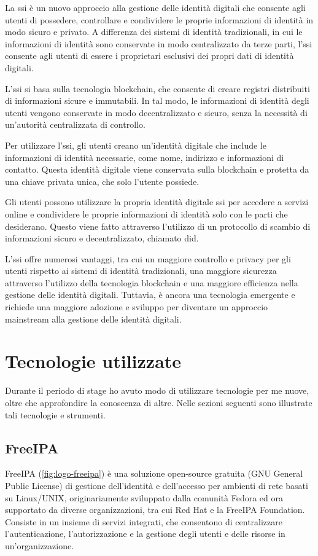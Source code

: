 La \acrfull{ssi}\cite{site:ssi} è un nuovo approccio alla gestione delle identità digitali che consente agli utenti di possedere, controllare e condividere le proprie informazioni di identità in modo sicuro e privato. A differenza dei sistemi di identità tradizionali, in cui le informazioni di identità sono conservate in modo centralizzato da terze parti, l'\acrshort{ssi} consente agli utenti di essere i proprietari esclusivi dei propri dati di identità digitali.

L'\acrshort{ssi} si basa sulla tecnologia blockchain, che consente di creare registri distribuiti di informazioni sicure e immutabili. In tal modo, le informazioni di identità degli utenti vengono conservate in modo decentralizzato e sicuro, senza la necessità di un'autorità centralizzata di controllo.

Per utilizzare l'\acrshort{ssi}, gli utenti creano un'identità digitale che include le informazioni di identità necessarie, come nome, indirizzo e informazioni di contatto. Questa identità digitale viene conservata sulla blockchain e protetta da una chiave privata unica, che solo l'utente possiede.

Gli utenti possono utilizzare la propria identità digitale \acrshort{ssi} per accedere a servizi online e condividere le proprie informazioni di identità solo con le parti che desiderano. Questo viene fatto attraverso l'utilizzo di un protocollo di scambio di informazioni sicuro e decentralizzato, chiamato \acrfull{did}.

L'\acrshort{ssi} offre numerosi vantaggi, tra cui un maggiore controllo e privacy per gli utenti rispetto ai sistemi di identità tradizionali, una maggiore sicurezza attraverso l'utilizzo della tecnologia blockchain e una maggiore efficienza nella gestione delle identità digitali. Tuttavia, è ancora una tecnologia emergente e richiede una maggiore adozione e sviluppo per diventare un approccio mainstream alla gestione delle identità digitali.

\section{Tecnologie utilizzate}

Durante il periodo di stage ho avuto modo di utilizzare tecnologie per me nuove, oltre che approfondire la conoscenza di altre. Nelle sezioni seguenti sono illustrate tali tecnologie e strumenti.

\subsection{FreeIPA}
FreeIPA\cite{site:freeipa-website} (\autoref{fig:logo-freeipa}) è una soluzione open-source gratuita (GNU General Public License) di gestione dell'identità e dell'accesso per ambienti di rete basati su Linux/UNIX, originariamente sviluppato dalla comunità Fedora ed ora supportato da diverse organizzazioni, tra cui Red Hat e la FreeIPA Foundation. Consiste in un insieme di servizi integrati, che consentono di centralizzare l'autenticazione, l'autorizzazione e la gestione degli utenti e delle risorse in un'organizzazione.




